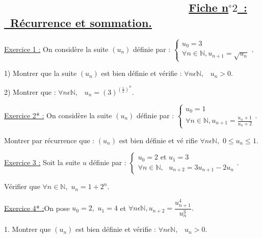 \documentclass{article}
\begin{document}
\subsection{ \protect\bigskip\ \ \ \ \ \ \ \ \ \ \ \ \ \ \ \ \ \ \ \ \ \ \ \
\ \ \ \ \ \ \protect\underline{\textbf{Fiche n}$%
{{}^\circ}%
2$\textbf{\ : \ R\'{e}currence et sommation.}}}

\underline{Exercice 1 :} On consid\`{e}re la suite $(u_{n})$ d\'{e}finie par
: $\left\{ 
\begin{array}{c}
u_{0}=3 \\ 
\forall n\in 
\mathbb{N}
,u_{n+1}=\sqrt{u_{n}}%
\end{array}%
\right. .$

1) Montrer que la suite $(u_{n})$ est bien d\'{e}finie et v\'{e}rifie : $%
\forall n\epsilon \mathbb{N},$ \ $u_{n}>0.$

2) Montrer que : $\forall n\epsilon \mathbb{N},$ \ $u_{n}=\left( 3\right)
^{\left( \frac{1}{2}\right) ^{n}}.$

\underline{Exercice 2* :} On consid\`{e}re la suite $(u_{n})$ d\'{e}finie
par : $\left\{ 
\begin{array}{c}
u_{0}=1 \\ 
\forall n\in 
\mathbb{N}
,u_{n+1}=\frac{u_{n}+1}{u_{n}+2}%
\end{array}%
\right. .$

Montrer par r\'{e}currence que : $(u_{n})$ est bien d\'{e}finie et v\'{e}%
rifie $\forall n\epsilon \mathbb{N},$ $0\leq u_{n}\leq 1.$

\underline{Exercice 3 :} Soit la suite $u$ d\'{e}finie par : $\left\{ 
\begin{array}{c}
u_{0}=2\text{ et }u_{1}=3 \\ 
\forall n\in 
\mathbb{N}
,\text{ }u_{n+2}=3u_{n+1}-2u_{n}%
\end{array}%
.\right. $

V\'{e}rifier que $\forall n\in 
\mathbb{N}
,$ $u_{n}=1+2^{n}.$

\underline{Exercice 4* :}On pose $u_{0}=2,$ $u_{1}=4$ et $\forall n\epsilon 
\mathbb{N},u_{n+2}=\dfrac{u_{n+1}^{4}}{u_{n}^{3}}.$

1. Montrer que $(u_{n})$ est bien d\'{e}finie et v\'{e}rifie : $\forall
n\epsilon \mathbb{N},$ \ $u_{n}>0.$
\end{document}
